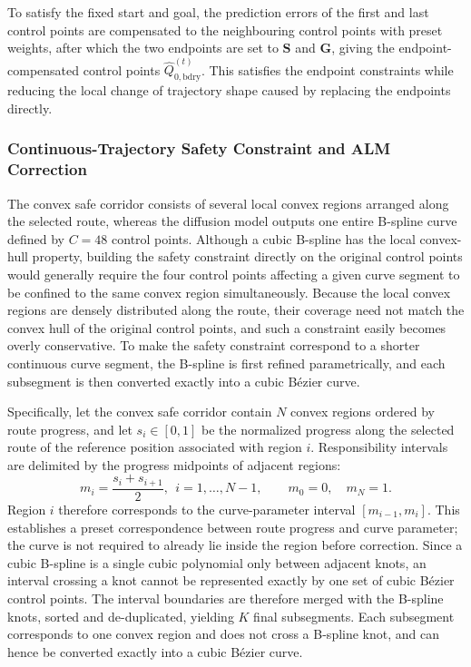 \documentclass[journal]{IEEEtran}
\newcommand{\Qbdry}{\widehat{Q}_{0,\mathrm{bdry}}^{(t)}}
\begin{document}
To satisfy the fixed start and goal, the prediction errors of the first and
last control points are compensated to the neighbouring control points with
preset weights, after which the two endpoints are set to $\bm S$ and $\bm G$,
giving the endpoint-compensated control points $\Qbdry$. This satisfies the
endpoint constraints while reducing the local change of trajectory shape caused
by replacing the endpoints directly.

\subsubsection{Continuous-Trajectory Safety Constraint and ALM Correction}

The convex safe corridor consists of several local convex regions arranged
along the selected route, whereas the diffusion model outputs one entire
B-spline curve defined by $C=48$ control points. Although a cubic B-spline has
the local convex-hull property, building the safety constraint directly on the
original control points would generally require the four control points
affecting a given curve segment to be confined to the same convex region
simultaneously. Because the local convex regions are densely distributed along
the route, their coverage need not match the convex hull of the original
control points, and such a constraint easily becomes overly conservative. To
make the safety constraint correspond to a shorter continuous curve segment,
the B-spline is first refined parametrically, and each subsegment is then
converted exactly into a cubic B\'ezier curve.

Specifically, let the convex safe corridor contain $N$ convex regions ordered
by route progress, and let $s_i\in[0,1]$ be the normalized progress along the
selected route of the reference position associated with region $i$.
Responsibility intervals are delimited by the progress midpoints of adjacent
regions:
\begin{equation}
m_i=\frac{s_i+s_{i+1}}{2},\ \ i=1,\ldots,N-1,
\qquad m_0=0,\quad m_N=1.
\end{equation}
Region $i$ therefore corresponds to the curve-parameter interval
$[m_{i-1},m_i]$. This establishes a preset correspondence between route
progress and curve parameter; the curve is not required to already lie inside
the region before correction. Since a cubic B-spline is a single cubic
polynomial only between adjacent knots, an interval crossing a knot cannot be
represented exactly by one set of cubic B\'ezier control points. The interval
boundaries are therefore merged with the B-spline knots, sorted and
de-duplicated, yielding $K$ final subsegments. Each subsegment corresponds to
one convex region and does not cross a B-spline knot, and can hence be
converted exactly into a cubic B\'ezier curve.
\end{document}
